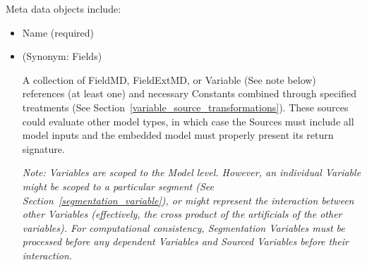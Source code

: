 \documentclass[10pt]{article}
\begin{document}
            Meta data objects include:
                \begin{itemize}[label=-,noitemsep,topsep=0pt]
                    \item Name (required)
                    \item {} (Synonym: Fields)\par
                        A collection of  FieldMD, FieldExtMD, or Variable (See note below) references (at least one) and
                        necessary Constants combined through specified treatments (See Section~\ref{variable_source_transformations}).
                        These sources could evaluate other model types, in which case the Sources must include all model inputs and the
                        embedded model must properly present its return signature.\par {\em  Note: Variables are scoped to the Model level.
                        However, an individual Variable might be scoped to a particular segment (See Section~\ref{segmentation_variable}),
                        or might represent the interaction between other Variables (effectively, the cross product of the artificials of the
                        other variables).  For computational consistency, Segmentation Variables must be processed before any dependent
                        Variables and Sourced Variables before their interaction.  }
                        

\end{itemize}
\end{document}
